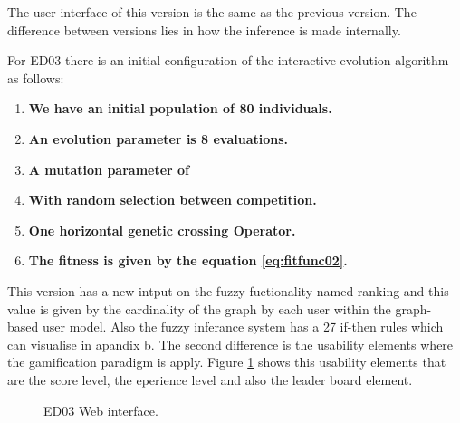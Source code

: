The user interface of this version is the same as the previous version. The difference between versions lies in how the inference is made internally.

For ED03 there is an initial configuration of the interactive evolution algorithm as follows:

\begin{enumerate}
	\item  \textbf{We have an initial population of 80 individuals.}
	
	\item  \textbf{An evolution parameter is 8 evaluations.}
	
	\item  \textbf{A mutation parameter of } 
	\item  \textbf{With random selection between competition.} 
	\item  \textbf{One horizontal genetic crossing Operator.}
	\item  \textbf{The fitness is given by the equation \ref{eq:fitfunc02}.}
\end{enumerate}

This version has a new intput on the fuzzy fuctionality named ranking and this
value is given by the cardinality of the graph by each user within the graph-
based user model. Also the fuzzy inferance system has a 27 if-then rules which
can visualise in apandix b. The second difference is the usability elements
where the gamification paradigm is apply. Figure \ref{fig:intarface03} shows this
usability elements that are the score level, the eperience level and also the
leader board element.

\begin{figure}
\captionsetup{justification=centering,margin=2cm}
\centering
\setlength\fboxsep{0pt}
\setlength\fboxrule{0.7pt}
\caption{ED03 Web interface.}
\label{fig:intarface03}       
\end{figure}

